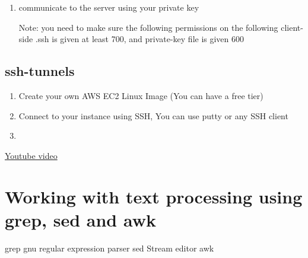 \documentclass{article}
\begin{document}
\begin{enumerate}
  \item communicate to the server using your private key
  

  Note: you need to make sure the following permissions on the following client-side
  .ssh is given at least 700, and private-key file is given 600 

\end{enumerate}


\subsection{ssh-tunnels}

\begin{enumerate}
  \item Create your own AWS EC2 Linux Image (You can have a free tier)
  \item  Connect to your instance using SSH, You can use putty or any SSH client
  \item 
\end{enumerate}

\href{https://www.youtube.com/watch?v=6x_okhl_CF4}{Youtube video}

\section{Working with text processing using grep, sed and awk}
grep gnu regular expression parser
sed Stream editor
awk 
\end{document}
